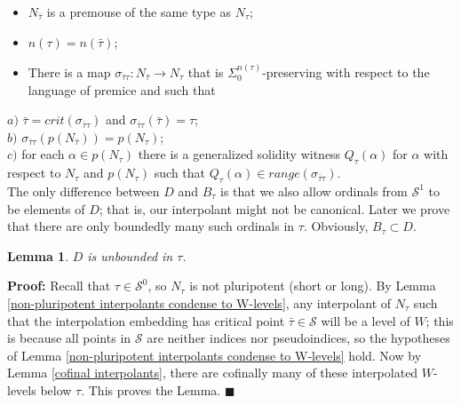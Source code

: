 \documentclass[12pt]{article}
\newtheorem{lem}[thm]{Lemma}
\begin{document}
\begin{itemize}
\item{$N_{\bar{\tau}}$ is a premouse of the same type as $N_\tau$;}
\item{$n(\tau) = n(\bar{\tau})$;}
\item{There is a map $\sigma_{\bar{\tau} \tau } : N_{\bar{\tau}} \longrightarrow N_\tau$ that is $\Sigma_0^{n(\tau)}$-preserving with respect to the language of premice and such that}
\end{itemize}

\indent \indent $a)$ $\bar{\tau} = crit (\sigma_{\bar{\tau} \tau })$ and $\sigma_{\bar{\tau} \tau } (\bar{\tau}) = \tau $;\\

\indent \indent $b)$ $\sigma_{\bar{\tau} \tau } (p ( N_{\bar{\tau}})) = p ( N_\tau)$;\\

\indent \indent $c)$ for each $\alpha \in p( N_\tau )$ there is a generalized solidity witness $Q_\tau (\alpha )$ for $\alpha$ with respect to $N_\tau$ and $p(N_\tau)$ such that $Q_\tau (\alpha ) \in range ( \sigma_{\bar{\tau} \tau } )$.\\


The only difference between $D$ and $B_\tau$ is that we also allow ordinals from $\mathcal{S}^1$ to be elements of $D$; that is, our interpolant might not be canonical.  Later we prove that there are only boundedly many such ordinals in $\tau$.  Obviously, $B_\tau \subset D$.\\

\begin{lem}
$D$ is unbounded in $\tau$.
\end{lem}

\textbf{Proof:}  Recall that $\tau \in \mathcal{S}^0$, so $N_\tau$ is not pluripotent (short or long).  By Lemma \ref{non-pluripotent interpolants condense to W-levels}, any interpolant of $N_\tau$ such that the interpolation embedding has critical point $\bar{\tau} \in \mathcal{S}$ will be a level of $W$; this is because all points in $\mathcal{S}$ are neither indices nor pseudoindices, so the hypotheses of Lemma \ref{non-pluripotent interpolants condense to W-levels} hold.  Now by Lemma \ref{cofinal interpolants}, there are cofinally many of these interpolated $W$-levels below $\tau$.  This proves the Lemma. $\blacksquare$\\
\end{document}
